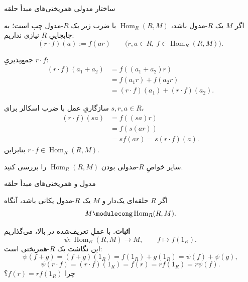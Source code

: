 \begin{frame}[t]{ساختار مدولی همریختی‌های مبدأ حلقه}
    \label{lec07:hom-ring-action}
    \begin{remark}
        اگر \(M\) یک \(R\)-مدول باشد، \(\operatorname{Hom}_R(R,M)\) با ضرب زیر یک \(R\)-مدول چپ است؛ به جابجاییِ \(R\) نیازی نداریم:
        \[
            (r\cdot f)(a):=f(ar)\qquad
            \bigl(r,a\in R,\ f\in\operatorname{Hom}_R(R,M)\bigr).
        \]
    \end{remark}
    جمع‌پذیریِ \(r\cdot f\):
    \[
        \begin{aligned}
            (r\cdot f)(a_1+a_2)&=f((a_1+a_2)r)\\
                &=f(a_1r)+f(a_2r)\\
                &=(r\cdot f)(a_1)+(r\cdot f)(a_2).
        \end{aligned}
    \]
\end{frame}

\begin{frame}[t]{سازگاریِ عمل با ضرب اسکالر}
    \label{lec07:hom-ring-action-linearity}
    برای \(s,r,a\in R\)،
    \[
        \begin{aligned}
            (r\cdot f)(sa)&=f((sa)r)\\
                &=f(s(ar))\\
                &=s f(ar)=s(r\cdot f)(a).
        \end{aligned}
    \]
    بنابراین \(r\cdot f\in\operatorname{Hom}_R(R,M)\).
    \begin{exercise}
        سایر خواصِ \(R\)-مدولی بودن \(\operatorname{Hom}_R(R,M)\) را بررسی کنید.
    \end{exercise}
\end{frame}

\begin{frame}[t]{مدول و همریختی‌های مبدأ حلقه}
    \label{lec07:evaluation-isomorphism}
    \begin{theorem}
        اگر \(R\) حلقه‌ای یک‌دار و \(M\) یک \(R\)-مدول یکانی باشد، آنگاه
        \[
            M\modulecong\operatorname{Hom}_R(R,M).
        \]
    \end{theorem}
    \textbf{اثبات.} با عملِ تعریف‌شده در بالا، می‌گذاریم
    \[
        \psi:\operatorname{Hom}_R(R,M)\longrightarrow M,\qquad f\longmapsto f(1_R).
    \]
    این نگاشت یک \(R\)-همریختی است:
    \[
        \psi(f+g)=(f+g)(1_R)=f(1_R)+g(1_R)=\psi(f)+\psi(g),
    \]
    \[
        \psi(r\cdot f)=(r\cdot f)(1_R)=f(r)=rf(1_R)=r\psi(f).
    \]
    \alert{چرا \(f(r)=rf(1_R)\)؟}
\end{frame}

